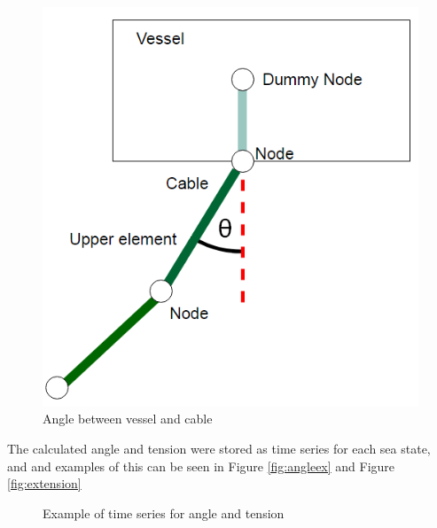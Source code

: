 \begin{figure}[H]
\centering
\includegraphics[scale=0.5]{figures/angle}
\caption[Angle between vessel and cable ]{Angle between vessel and cable  }
 \label{fig:angle}
\end{figure}

\noindent The calculated angle and tension were stored as time series for each sea state, and and examples of this can be seen in Figure \ref{fig:angleex} and Figure \ref{fig:extension}

\begin{figure}[H]
\hfill
{}\hfill
\caption{Example of time series for angle and tension}
\label{fig:local1}
\end{figure}

